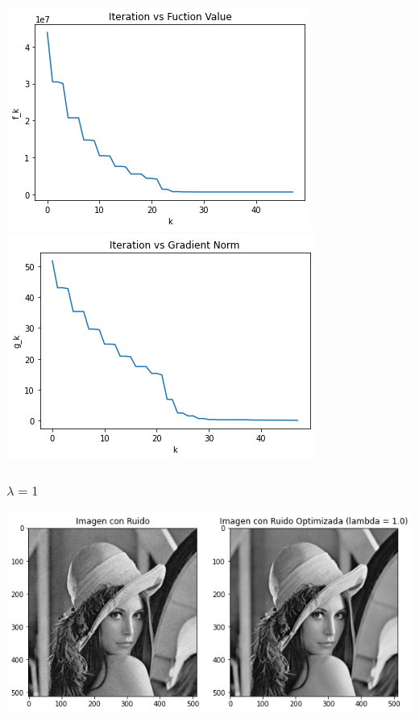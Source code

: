 \documentclass[11pt,letterpaper]{article}
\theoremstyle{definition}
\theoremstyle{definition}
\theoremstyle{definition}
\begin{document}
\begin{center}
	\includegraphics[width=0.6\linewidth]{graficas/hs/funcion_0}
	\includegraphics[width=0.6\linewidth]{graficas/hs/gradiente_0}
\end{center}

\subsubsection{$ \lambda = 1 $}
\begin{center}
	\includegraphics[width=0.75\linewidth]{graficas/hs/optimizada_1}
\end{center}
\end{document}
